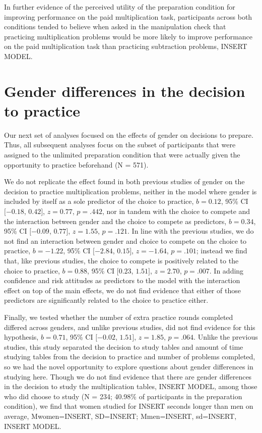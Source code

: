 \documentclass[a4paper,nobind]{templates/ociamthesis}
\begin{document}
In further evidence of the perceived utility of the preparation condition for improving performance on the paid multiplication task, participants across both conditions tended to believe when asked in the manipulation check that practicing multiplication problems would be more likely to improve performance on the paid multiplication task than practicing subtraction problems, INSERT MODEL.

\hypertarget{gender-differences-in-the-decision-to-practice}{%
\section{Gender differences in the decision to practice}\label{gender-differences-in-the-decision-to-practice}}

Our next set of analyses focused on the effects of gender on decisions to prepare. Thus, all subsequent analyses focus on the subset of participants that were assigned to the unlimited preparation condition that were actually given the opportunity to practice beforehand (N = 571).

We do not replicate the effect found in both previous studies of gender on the decision to practice multiplication problems, neither in the model where gender is included by itself as a sole predictor of the choice to practice, \(b = 0.12\), 95\% CI \([-0.18\), \(0.42]\), \(z = 0.77\), \(p = .442\), nor in tandem with the choice to compete and the interaction between gender and the choice to compete as predictors, \(b = 0.34\), 95\% CI \([-0.09\), \(0.77]\), \(z = 1.55\), \(p = .121\). In line with the previous studies, we do not find an interaction between gender and choice to compete on the choice to practice, \(b = -1.22\), 95\% CI \([-2.84\), \(0.15]\), \(z = -1.64\), \(p = .101\); instead we find that, like previous studies, the choice to compete is positively related to the choice to practice, \(b = 0.88\), 95\% CI \([0.23\), \(1.51]\), \(z = 2.70\), \(p = .007\). In adding confidence and risk attitudes as predictors to the model with the interaction effect on top of the main effects, we do not find evidence that either of those predictors are significantly related to the choice to practice either.

Finally, we tested whether the number of extra practice rounds completed differed across genders, and unlike previous studies, did not find evidence for this hypothesis, \(b = 0.71\), 95\% CI \([-0.02\), \(1.51]\), \(z = 1.85\), \(p = .064\). Unlike the previous studies, this study separated the decision to study tables and amount of time studying tables from the decision to practice and number of problems completed, so we had the novel opportunity to explore questions about gender differences in studying here. Though we do not find evidence that there are gender differences in the decision to study the multiplication tables, INSERT MODEL, among those who did choose to study (N = 234; 40.98\% of participants in the preparation condition), we find that women studied for INSERT seconds longer than men on average, Mwomen=INSERT, SD=INSERT; Mmen=INSERT, sd=INSERT, INSERT MODEL.
\end{document}
